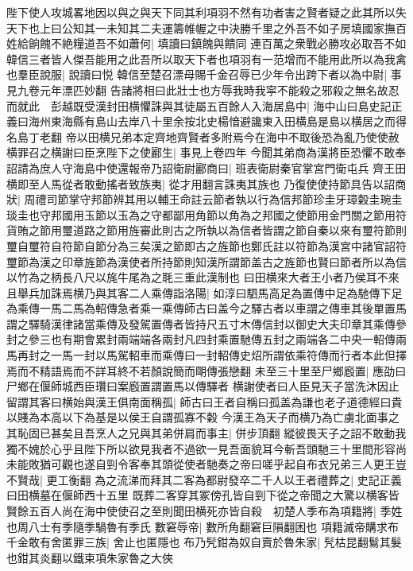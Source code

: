 陛下使人攻城畧地因以與之與天下同其利項羽不然有功者害之賢者疑之此其所以失天下也上曰公知其一未知其二夫運籌帷幄之中決勝千里之外吾不如子房填國家撫百姓給餉餽不絶糧道吾不如蕭何|{
	填讀曰鎮餽與饋同}
連百萬之衆戰必勝攻必取吾不如韓信三者皆人傑吾能用之此吾所以取天下者也項羽有一范增而不能用此所以為我禽也羣臣說服|{
	說讀曰悦}
韓信至楚召漂母賜千金召辱已少年令出跨下者以為中尉|{
	事見九卷元年漂匹妙翻}
告諸將相曰此壯士也方辱我時我寜不能殺之邪殺之無名故忍而就此　彭越既受漢封田横懼誅與其徒屬五百餘人入海居島中|{
	海中山曰島史記正義曰海州東海縣有島山去岸八十里余按北史楊愔避讒東入田横島是島以横居之而得名島丁老翻}
帝以田横兄弟本定齊地齊賢者多附焉今在海中不取後恐為亂乃使使赦横罪召之横謝曰臣烹陛下之使酈生|{
	事見上卷四年}
今聞其弟商為漢將臣恐懼不敢奉詔請為庶人守海島中使還報帝乃詔衛尉酈商曰|{
	班表衛尉秦官掌宮門衛屯兵}
齊王田横即至人馬從者敢動搖者致族夷|{
	從才用翻言誅夷其族也}
乃復使使持節具告以詔商狀|{
	周禮司節掌守邦節辨其用以輔王命註云節者執以行為信邦節珍圭牙璋糓圭琬圭琰圭也守邦國用玉節以玉為之守都鄙用角節以角為之邦國之使節用金門關之節用符貨賄之節用璽道路之節用旌審此則古之所執以為信者皆謂之節自秦以來有璽符節則璽自璽符自符節自節分為三矣漢之節即古之旌節也鄭氏註以符節為漢宮中諸官詔符璽節為漢之印章旌節為漢使者所持節則知漢所謂節盖古之旌節也賢曰節者所以為信以竹為之柄長八尺以旄牛尾為之毦三重此漢制也}
曰田横來大者王小者乃侯耳不來且舉兵加誅焉横乃與其客二人乘傳詣洛陽|{
	如淳曰駟馬高足為置傳中足為馳傳下足為乘傳一馬二馬為軺傳急者乘一乘傳師古曰盖今之驛古者以車謂之傳車其後單置馬謂之驛騎漢律諸當乘傳及發駕置傳者皆持尺五寸木傳信封以御史大夫印章其乘傳參封之參三也有期會累封兩端端各兩封凡四封乘置馳傳五封之兩端各二中央一軺傳兩馬再封之一馬一封以馬駕軺車而乘傳曰一封軺傳史炤所謂依乘符傳而行者本此但擇焉而不精語焉而不詳耳終不若顏說簡而朙傳張戀翻}
未至三十里至尸鄉廏置|{
	應劭曰尸鄉在偃師城西臣瓚曰案廏置謂置馬以傳驛者}
横謝使者曰人臣見天子當洗沐因止留謂其客曰横始與漢王俱南面稱孤|{
	師古曰王者自稱曰孤盖為謙也老子道德經曰貴以賤為本高以下為基是以侯王自謂孤寡不糓}
今漢王為天子而横乃為亡虜北面事之其恥固已甚矣且吾烹人之兄與其弟併肩而事主|{
	併步頂翻}
縱彼畏天子之詔不敢動我獨不媿於心乎且陛下所以欲見我者不過欲一見吾面貌耳今斬吾頭馳三十里間形容尚未能敗猶可觀也遂自剄令客奉其頭從使者馳奏之帝曰嗟乎起自布衣兄弟三人更王豈不賢哉|{
	更工衡翻}
為之流涕而拜其二客為都尉發卒二千人以王者禮葬之|{
	史記正義曰田横墓在偃師西十五里}
既葬二客穿其冢傍孔皆自剄下從之帝聞之大驚以横客皆賢餘五百人尚在海中使使召之至則聞田横死亦皆自殺　初楚人季布為項籍將|{
	季姓也周八士有季隨季騧魯有季氏}
數窘辱帝|{
	數所角翻窘巨隕翻困也}
項籍滅帝購求布千金敢有舍匿罪三族|{
	舍止也匿隱也}
布乃髠鉗為奴自賣於魯朱家|{
	髠枯昆翻鬄其髮也鉗其炎翻以鐵束項朱家魯之大俠}
